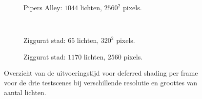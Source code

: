 \begin{figure}[t]
\begin{adjustbox}{minipage=\textwidth, scale=0.6}
\begin{subfigure}[b]{0.8\textwidth}
      \label{fig:ts-frames-deferred:alley-low}
    \end{subfigure}
  \end{adjustbox}\hspace{-0.075\textwidth}  %
  \begin{adjustbox}{minipage=\textwidth, scale=0.6}
    \begin{subfigure}[b]{0.8\textwidth}
      \centering
      \def\svgwidth{\textwidth}
      
      \caption{Pipers Alley: $1044$ lichten, $2560^2$ pixels.}
      \label{fig:ts-frames-deferred:alley-high}
    \end{subfigure}
  \end{adjustbox} \\
  \begin{adjustbox}{minipage=\textwidth, scale=0.6}
    \begin{subfigure}[b]{0.8\textwidth}
      \centering
      \def\svgwidth{\textwidth}
      
      \caption{Ziggurat stad: $65$ lichten, $320^2$ pixels.}
      \label{fig:ts-frames-deferred:city-low}
    \end{subfigure}
  \end{adjustbox}\hspace{-0.075\textwidth}  %
  \begin{adjustbox}{minipage=\textwidth, scale=0.6}
    \begin{subfigure}[b]{0.8\textwidth}
      \centering
      \def\svgwidth{\textwidth}
      
      \caption{Ziggurat stad: $1170$ lichten, $2560$ pixels.}
      \label{fig:ts-frames-deferred:city-high}
    \end{subfigure}
  \end{adjustbox}
  \caption{Overzicht van de uitvoeringstijd voor deferred shading per frame voor de
           drie testscenes bij verschillende resolutie en groottes van aantal
           lichten.}
  \label{fig:ts-frames-deferred}
\end{figure}

